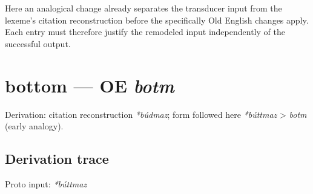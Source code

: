 \documentclass[
  british,
  a4paper,
  openany]{book}
\providecommand{\texorpdfstring}[2]{#1}
\begin{document}
Here an analogical change already separates the transducer input from
the lexeme's citation reconstruction before the specifically Old English
changes apply. Each entry must therefore justify the remodeled input
independently of the successful output.

\section{\texorpdfstring{bottom --- OE
\emph{botm}}{bottom --- OE botm}}\label{bottom-oe-botm}


Derivation: citation reconstruction \emph{*búdmaz}; form followed here
\emph{*búttmaz} \textgreater{} \emph{botm} (early analogy).

\subsection{Derivation trace}\label{derivation-trace-74}

Proto input: \emph{*búttmaz}

\begingroup
\setlength{\fboxsep}{6pt}
\end{document}
